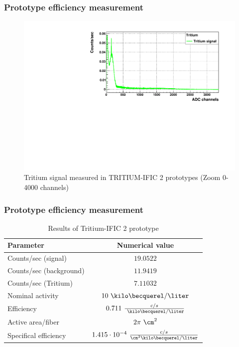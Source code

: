 \documentclass{beamer}
\begin{document}
\begin{frame}
\frametitle{Prototype efficiency measurement}

\begin{figure}[hbtp]
\centering
\includegraphics[scale=0.6]{Imagenes/2Efficiency/Net_tritium_signal_real_time_ZOOM.pdf}
\caption{Tritium signal measured in TRITIUM-IFIC 2 prototypes (Zoom 0-4000 channels)}
\end{figure}

\end{frame}

\begin{frame}
\frametitle{Prototype efficiency measurement}

\begin{table}
\begin{tabular}{l | c}
Parameter & Numerical value\\
\hline \hline
Counts/sec (signal) & $19.0522$ \\
Counts/sec (background) & $11.9419$ \\
Counts/sec (Tritium) & $7.11032$ \\
Nominal activity & $10~\kilo\becquerel/\liter$\\
Efficiency & $0.711 ~\frac{c/s}{~\kilo\becquerel/\liter}$ \\
Active area/fiber & $2\pi~\cm^2$\\
Specifical efficiency & $1.415\cdot{}10^{-4}~\frac{c/s}{\cm^2\kilo\becquerel/\liter}$ \\
\end{tabular}

\caption{Results of Tritium-IFIC 2 prototype}
\end{table}

\end{frame}
\end{document}
